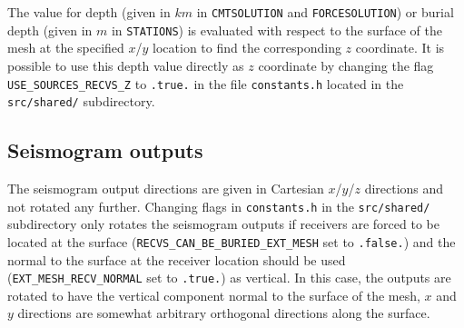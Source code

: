 The value for depth (given in $km$ in \texttt{CMTSOLUTION} and \texttt{FORCESOLUTION})
or burial depth (given in $m$ in \texttt{STATIONS}) is evaluated
with respect to the surface of the mesh at the specified $x$/$y$
location to find the corresponding $z$ coordinate. It is possible
to use this depth value directly as $z$ coordinate by changing the
flag \texttt{USE\_SOURCES\_RECVS\_Z} to \texttt{.true.} in the file
\texttt{constants.h} located in the \texttt{src/shared/} subdirectory.


\subsection*{Seismogram outputs}

The seismogram output directions are given in Cartesian $x$/$y$/$z$
directions and not rotated any further. Changing flags in \texttt{constants.h}
in the \texttt{src/shared/} subdirectory only rotates the seismogram
outputs if receivers are forced to be located at the surface (\texttt{RECVS\_CAN\_BE\_BURIED\_EXT\_MESH}
set to \texttt{.false.}) and the normal to the surface at the receiver
location should be used (\texttt{EXT\_MESH\_RECV\_NORMAL} set to \texttt{.true.})
as vertical. In this case, the outputs are rotated to have the vertical
component normal to the surface of the mesh, $x$ and $y$ directions
are somewhat arbitrary orthogonal directions along the surface.

